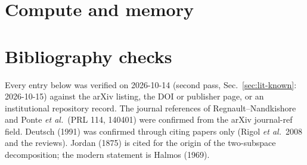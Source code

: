\documentclass[11pt]{article}
\begin{document}
\section{Compute and memory}
\label{sec:memory}


\appendix
\section{Bibliography checks}
Every entry below was verified on 2026-10-14 (second pass, Sec.~\ref{sec:lit-known}: 2026-10-15) against the arXiv listing, the DOI or publisher page, or an institutional
repository record. The journal references of Regnault--Nandkishore and Ponte \emph{et al.}\ (PRL 114, 140401) were
confirmed from the arXiv journal-ref field. Deutsch (1991) was confirmed through citing papers only (Rigol \emph{et al.}\
2008 and the reviews). Jordan (1875) is cited for the origin of the two-subspace decomposition; the modern statement is
Halmos (1969).


\end{document}
